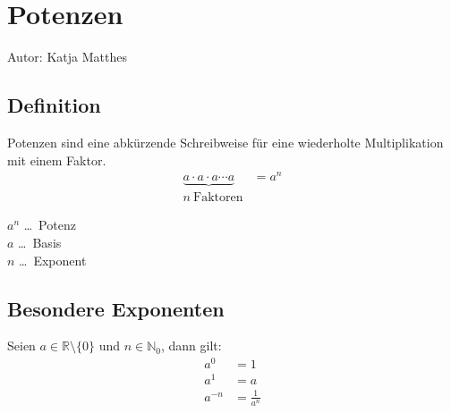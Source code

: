 \section{Potenzen}
\label{Potenzen}
Autor: Katja Matthes
\subsection{Definition}
Potenzen sind eine abkürzende Schreibweise für eine wiederholte Multiplikation mit einem Faktor.
   \[ \begin{matrix} \underbrace{ a\cdot a\cdot a\cdots a }&=a^n\\{n\ \mathrm{Faktoren}} \end{matrix} \]
\begin{multicols}{3}
	$ a^n $ \ldots\ Potenz \\
  $ a $ \ldots\ Basis\\
  $ n $ \ldots\ Exponent
\end{multicols}
\subsection{Besondere Exponenten}
Seien $ a \in \mathbb{R}\setminus\{0\} $ und $ n \in \mathbb{N}_{0} $, dann gilt:
\begin{align*}
    a^0 &= 1 \\
    a^1 &= a \\
    a^{-n} &= \frac{1}{a^n} 
\end{align*}
